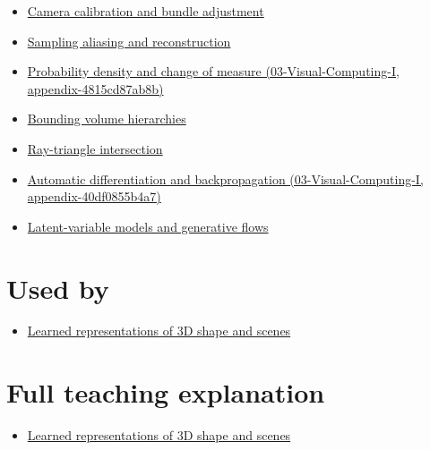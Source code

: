 \begin{itemize}
\tightlist
\item
  \hyperref[appendix-3ee9861904d5]{Camera calibration and bundle adjustment}
\item
  \hyperref[appendix-6a7869dd79a6]{Sampling aliasing and reconstruction}
\item
  \href{../03-Visual-Computing-I/main.pdf\#nameddest=appendix-4815cd87ab8b}{Probability density and change of measure (03-Visual-Computing-I, appendix-4815cd87ab8b)}
\item
  \hyperref[appendix-0b426c47dd78]{Bounding volume hierarchies}
\item
  \hyperref[appendix-47ac1bd6d144]{Ray-triangle intersection}
\item
  \href{../03-Visual-Computing-I/main.pdf\#nameddest=appendix-40df0855b4a7}{Automatic differentiation and backpropagation (03-Visual-Computing-I, appendix-40df0855b4a7)}
\item
  \hyperref[appendix-2c568f05ee34]{Latent-variable models and generative flows}
\end{itemize}

\section{Used by}\label{appendix-c5b332e400e7-used-by}

\begin{itemize}
\tightlist
\item
  \href{Continuous\%20Notes/University\%20-\%20Worlds,\%20Images\%20and\%20Inference\%20-\%20Graphics,\%20Vision\%20and\%20Photography\#Learned\%20representations\%20of\%203D\%20shape\%20and\%20scenes}{Learned representations of 3D shape and scenes}
\end{itemize}

\section{Full teaching explanation}\label{appendix-c5b332e400e7-full-teaching-explanation}

\begin{itemize}
\tightlist
\item
  \href{Continuous\%20Notes/University\%20-\%20Worlds,\%20Images\%20and\%20Inference\%20-\%20Graphics,\%20Vision\%20and\%20Photography\#Learned\%20representations\%20of\%203D\%20shape\%20and\%20scenes}{Learned representations of 3D shape and scenes}
\end{itemize}

